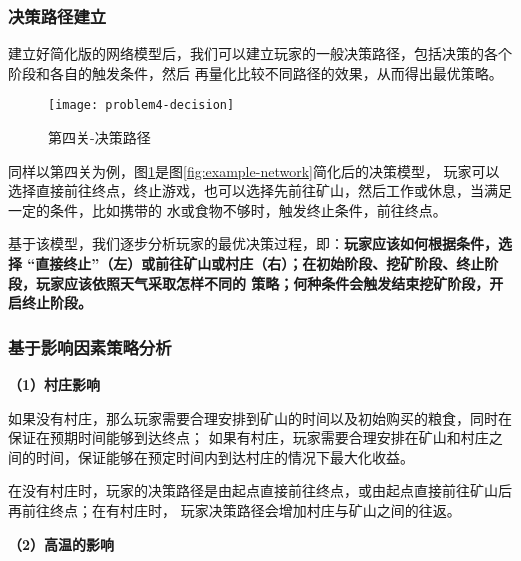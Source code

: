 \documentclass[bwprint]{cumcmthesis} %
\begin{document}
\subsubsection{决策路径建立}

建立好简化版的网络模型后，我们可以建立玩家的一般决策路径，包括决策的各个阶段和各自的触发条件，然后
再量化比较不同路径的效果，从而得出最优策略。


\begin{figure}[!h]
    \centering
    \texttt{[image: problem4-decision]}
    \caption{第四关-决策路径}
    \label{fig:example-decision}
\end{figure}

同样以第四关为例，图\ref{fig:example-decision}是图\ref{fig:example-network}简化后的决策模型，
玩家可以选择直接前往终点，终止游戏，也可以选择先前往矿山，然后工作或休息，当满足一定的条件，比如携带的
水或食物不够时，触发终止条件，前往终点。


基于该模型，我们逐步分析玩家的最优决策过程，即：\textbf{玩家应该如何根据条件，选择
“直接终止”（左）或前往矿山或村庄（右）；在初始阶段、挖矿阶段、终止阶段，玩家应该依照天气采取怎样不同的
策略；何种条件会触发结束挖矿阶段，开启终止阶段。}

\subsubsection{基于影响因素策略分析}


\textbf{（1）村庄影响}

如果没有村庄，那么玩家需要合理安排到矿山的时间以及初始购买的粮食，同时在保证在预期时间能够到达终点；
如果有村庄，玩家需要合理安排在矿山和村庄之间的时间，保证能够在预定时间内到达村庄的情况下最大化收益。

\begin{stratygy}
    在没有村庄时，玩家的决策路径是由起点直接前往终点，或由起点直接前往矿山后再前往终点；在有村庄时，
    玩家决策路径会增加村庄与矿山之间的往返。
    \label{str:hot}
\end{stratygy}

\textbf{（2）高温的影响}
\end{document}
